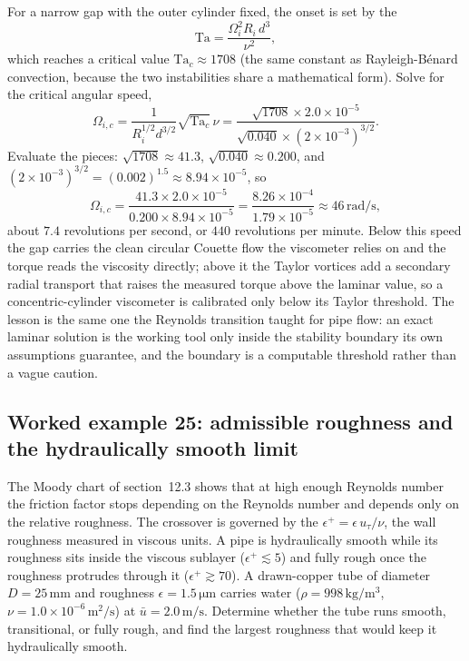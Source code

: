 For a narrow gap with the outer cylinder fixed, the onset is set by the
\[
\text{Ta} = \frac{\Omega_i^2 R_i\,d^3}{\nu^2},
\]
which reaches a critical value $\text{Ta}_c \approx 1708$ (the same
constant as Rayleigh-B\'enard convection, because the two instabilities
share a mathematical form). Solve for the critical angular speed,
\[
\Omega_{i,c} = \frac{1}{R_i^{1/2}d^{3/2}}\sqrt{\text{Ta}_c}\,\nu =
\frac{\sqrt{1708}\times2.0\times10^{-5}}{\sqrt{0.040}\times(2\times
10^{-3})^{3/2}}.
\]
Evaluate the pieces: $\sqrt{1708} \approx 41.3$, $\sqrt{0.040} \approx
0.200$, and $(2\times10^{-3})^{3/2} = (0.002)^{1.5} \approx 8.94\times
10^{-5}$, so
\[
\Omega_{i,c} = \frac{41.3\times2.0\times10^{-5}}{0.200\times8.94\times
10^{-5}} = \frac{8.26\times10^{-4}}{1.79\times10^{-5}} \approx 46\,\si{
\radian\per\second},
\]
about $7.4$ revolutions per second, or $440$ revolutions per minute.
Below this speed the gap carries the clean circular Couette flow the
viscometer relies on and the torque reads the viscosity directly; above
it the Taylor vortices add a secondary radial transport that raises the
measured torque above the laminar value, so a concentric-cylinder
viscometer is calibrated only below its Taylor threshold. The lesson is
the same one the Reynolds transition taught for pipe flow: an exact
laminar solution is the working tool only inside the stability boundary
its own assumptions guarantee, and the boundary is a computable
threshold rather than a vague caution.

\subsection*{Worked example 25: admissible roughness and the hydraulically smooth limit}

The Moody chart of section~12.3 shows that at high enough Reynolds
number the friction factor stops depending on the Reynolds number and
depends only on the relative roughness. The crossover is governed by
the  $\epsilon^+ = \epsilon\,
u_\tau/\nu$, the wall roughness measured in viscous units. A pipe is
hydraulically smooth while its roughness sits inside the viscous
sublayer ($\epsilon^+ \lesssim 5$) and fully rough once the roughness
protrudes through it ($\epsilon^+ \gtrsim 70$). A drawn-copper tube of
diameter $D = 25\,\si{\milli\meter}$ and roughness $\epsilon = 1.5\,
\si{\micro\meter}$ carries water ($\rho = 998\,\si{\kilogram\per\meter
\cubed}$, $\nu = 1.0\times10^{-6}\,\si{\meter}^2/\si{\second}$) at
$\bar u = 2.0\,\si{\meter\per\second}$. Determine whether the tube runs
smooth, transitional, or fully rough, and find the largest roughness
that would keep it hydraulically smooth.

